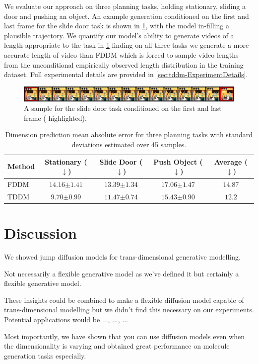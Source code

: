 We evaluate our approach on three planning tasks, holding stationary, sliding a door and pushing an object. An example generation conditioned on the first and last frame for the slide door task is shown in \cref{fig:tddm-video_example}, with the model in-filling a plausible trajectory. We quantify our model's ability to generate videos of a length appropriate to the task in \cref{tab:video_results} finding on all three tasks we generate a more accurate length of video than FDDM which is forced to sample video lengths from the unconditional empirically observed length distribution in the training dataset. Full experimental details are provided in \cref{sec:tddm-ExperimentDetails}.


\begin{figure}[t]
    \centering
    \includegraphics[width=\textwidth]{figs/tddm/21-1-padded_red_big.png}
    \caption{A sample for the slide door task conditioned on the first and last frame ({\color{red} highlighted}).}
    \label{fig:tddm-video_example}
\end{figure}

\begin{table}[t]
     \centering
   \caption{Dimension prediction mean absolute error for three planning tasks with standard deviations estimated over 45 samples.}
   \begin{tabular}{@{}lcccc@{}}
     \toprule
     Method & Stationary ($\downarrow$) & Slide Door ($\downarrow$) & Push Object ($\downarrow$) & Average ($\downarrow$)   \\ \midrule
     FDDM & $14.16 {\scriptstyle \pm 1.41}$ & $13.39 {\scriptstyle \pm 1.34}$ & $17.06 {\scriptstyle \pm 1.47}$ & $14.87$ \\
     TDDM & $\mathbf{9.70 {\scriptstyle \pm 0.99}}$ & $\mathbf{11.47 {\scriptstyle \pm 0.74}}$ & $\mathbf{15.43 {\scriptstyle \pm 0.90}}$ & $\mathbf{12.2}$ \\ \bottomrule
   \end{tabular}
   \label{tab:video_results}
\end{table}


\section{Discussion}

We showed jump diffusion models for trans-dimensional generative modelling.

Not necessarily a flexible generative model as we've defined it but certainly a flexible generative model.

These insights could be combined to make a flexible diffusion model capable of trans-dimensional modelling but we didn't find this necessary on our experiments. Potential applications would be ..., ..., ...

Most importantly, we have shown that you can use diffusion models even when the dimensionality is varying and obtained great performance on molecule generation tasks especially.